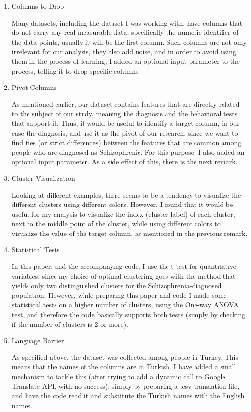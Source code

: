 \documentclass{article}
\begin{document}
\begin{enumerate}
    \item Columns to Drop

    Many datasets, including the dataset I was working with, have columns that do not carry any real measurable data, specifically the numeric identifier of the data points, usually it will be the first column. Such columns are not only irrelevant for our analysis, they also add noise, and in order to avoid using them in the process of learning, I added an optional input parameter to the process, telling it to drop specific columns.
    \item Pivot Columns

    As mentioned earlier, our dataset contains features that are directly related to the subject of our study, meaning the diagnosis and the behavioral tests that support it. Thus, it would be useful to identify a target column, in our case the diagnosis, and use it as the pivot of our research, since we want to find ties (or strict differences) between the features that are common among people who are diagnosed as Schizophrenic. For this purpose, I also added an optional input parameter. As a side effect of this, there is the next remark.

    \item Cluster Visualization

    Looking at different examples, there seems to be a tendency to visualize the different clusters using different colors. However, I found that it would be useful for my analysis to visualize the index (cluster label) of each cluster, next to the middle point of the cluster, while using different colors to visualize the value of the target column, as mentioned in the previous remark.

    \item Statistical Tests

    In this paper, and the accompanying code, I use the t-test for quantitative variables, since my choice of optimal clustering goes with the method that yields only two distinguished clusters for the Schizophrenia-diagnosed population. However, while preparing this paper and code I made some statistical tests on a higher number of clusters, using the One-way ANOVA test, and therefore the code basically supports both tests (simply by checking if the number of clusters is 2 or more).

    \item Language Barrier
    
    As specified above, the dataset was collected among people in Turkey. This means that the names of the columns are in Turkish. I have added a small mechanism to tackle this (after trying to add a dynamic call to Google Translate API, with no success), simply by preparing a .csv translation file, and have the code read it and substitute the Turkish names with the English names.
\end{enumerate}
\end{document}
